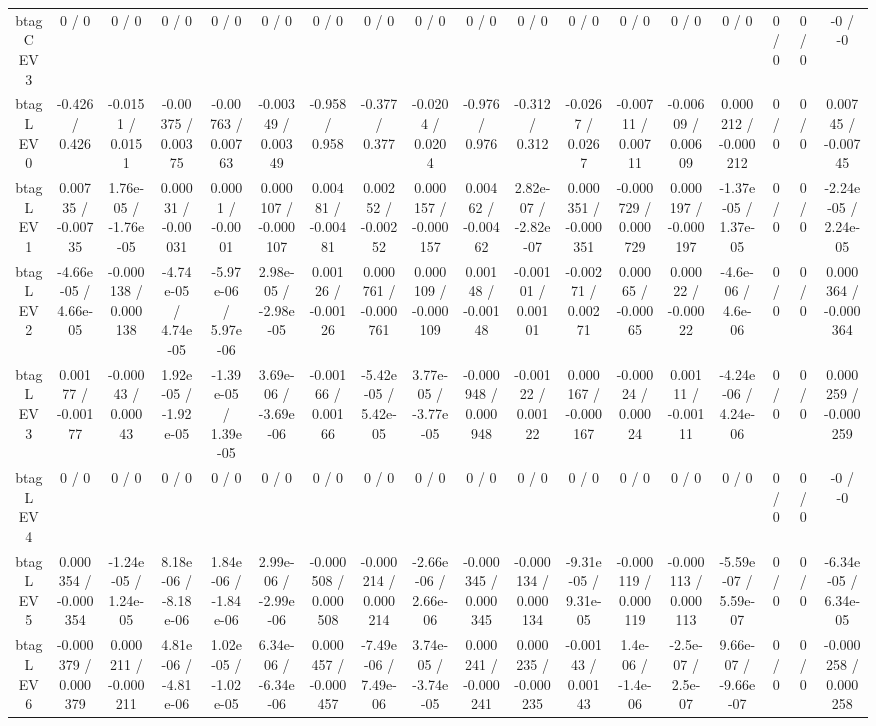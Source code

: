 \documentclass[10pt]{article}
\begin{document}
\begin{table}[htbp]
\begin{center}
\begin{tabular}{|c|c|c|c|c|c|c|c|c|c|c|c|c|c|c|c|c|c|}
  btag C EV 3 & 0 / 0 & 0 / 0 & 0 / 0 & 0 / 0 & 0 / 0 & 0 / 0 & 0 / 0 & 0 / 0 & 0 / 0 & 0 / 0 & 0 / 0 & 0 / 0 & 0 / 0 & 0 / 0 & 0 / 0 & 0 / 0 & -0 / -0 \\ 
  btag L EV 0 & -0.426 / 0.426 & -0.0151 / 0.0151 & -0.00375 / 0.00375 & -0.00763 / 0.00763 & -0.00349 / 0.00349 & -0.958 / 0.958 & -0.377 / 0.377 & -0.0204 / 0.0204 & -0.976 / 0.976 & -0.312 / 0.312 & -0.0267 / 0.0267 & -0.00711 / 0.00711 & -0.00609 / 0.00609 & 0.000212 / -0.000212 & 0 / 0 & 0 / 0 & 0.00745 / -0.00745 \\ 
  btag L EV 1 & 0.00735 / -0.00735 & 1.76e-05 / -1.76e-05 & 0.00031 / -0.00031 & 0.0001 / -0.0001 & 0.000107 / -0.000107 & 0.00481 / -0.00481 & 0.00252 / -0.00252 & 0.000157 / -0.000157 & 0.00462 / -0.00462 & 2.82e-07 / -2.82e-07 & 0.000351 / -0.000351 & -0.000729 / 0.000729 & 0.000197 / -0.000197 & -1.37e-05 / 1.37e-05 & 0 / 0 & 0 / 0 & -2.24e-05 / 2.24e-05 \\ 
  btag L EV 2 & -4.66e-05 / 4.66e-05 & -0.000138 / 0.000138 & -4.74e-05 / 4.74e-05 & -5.97e-06 / 5.97e-06 & 2.98e-05 / -2.98e-05 & 0.00126 / -0.00126 & 0.000761 / -0.000761 & 0.000109 / -0.000109 & 0.00148 / -0.00148 & -0.00101 / 0.00101 & -0.00271 / 0.00271 & 0.00065 / -0.00065 & 0.00022 / -0.00022 & -4.6e-06 / 4.6e-06 & 0 / 0 & 0 / 0 & 0.000364 / -0.000364 \\ 
  btag L EV 3 & 0.00177 / -0.00177 & -0.00043 / 0.00043 & 1.92e-05 / -1.92e-05 & -1.39e-05 / 1.39e-05 & 3.69e-06 / -3.69e-06 & -0.00166 / 0.00166 & -5.42e-05 / 5.42e-05 & 3.77e-05 / -3.77e-05 & -0.000948 / 0.000948 & -0.00122 / 0.00122 & 0.000167 / -0.000167 & -0.00024 / 0.00024 & 0.00111 / -0.00111 & -4.24e-06 / 4.24e-06 & 0 / 0 & 0 / 0 & 0.000259 / -0.000259 \\ 
  btag L EV 4 & 0 / 0 & 0 / 0 & 0 / 0 & 0 / 0 & 0 / 0 & 0 / 0 & 0 / 0 & 0 / 0 & 0 / 0 & 0 / 0 & 0 / 0 & 0 / 0 & 0 / 0 & 0 / 0 & 0 / 0 & 0 / 0 & -0 / -0 \\ 
  btag L EV 5 & 0.000354 / -0.000354 & -1.24e-05 / 1.24e-05 & 8.18e-06 / -8.18e-06 & 1.84e-06 / -1.84e-06 & 2.99e-06 / -2.99e-06 & -0.000508 / 0.000508 & -0.000214 / 0.000214 & -2.66e-06 / 2.66e-06 & -0.000345 / 0.000345 & -0.000134 / 0.000134 & -9.31e-05 / 9.31e-05 & -0.000119 / 0.000119 & -0.000113 / 0.000113 & -5.59e-07 / 5.59e-07 & 0 / 0 & 0 / 0 & -6.34e-05 / 6.34e-05 \\ 
  btag L EV 6 & -0.000379 / 0.000379 & 0.000211 / -0.000211 & 4.81e-06 / -4.81e-06 & 1.02e-05 / -1.02e-05 & 6.34e-06 / -6.34e-06 & 0.000457 / -0.000457 & -7.49e-06 / 7.49e-06 & 3.74e-05 / -3.74e-05 & 0.000241 / -0.000241 & 0.000235 / -0.000235 & -0.00143 / 0.00143 & 1.4e-06 / -1.4e-06 & -2.5e-07 / 2.5e-07 & 9.66e-07 / -9.66e-07 & 0 / 0 & 0 / 0 & -0.000258 / 0.000258 \\ 

\end{tabular}
\end{center}
\end{table}
\end{document}
